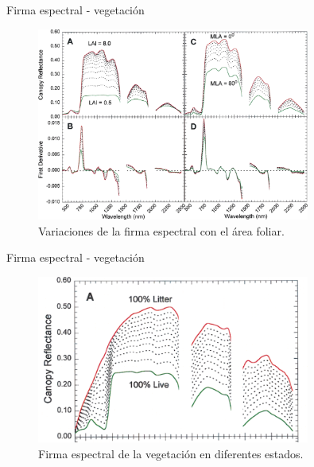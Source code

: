 \documentclass[]{beamer}
\begin{document}
\begin{frame}{Firma espectral - vegetación}
  \begin{figure}
  \centering
  \includegraphics[width=0.8\textwidth]{imagenes/leafvar.png}
  \caption{Variaciones de la firma espectral con el área foliar.}
  \end{figure}
\end{frame}

\begin{frame}{Firma espectral - vegetación}
    \begin{figure}
    \centering
    \includegraphics[width=0.8\textwidth]{imagenes/vivomuerto.png}
    \caption{Firma espectral de la vegetación en diferentes estados.}
    \end{figure}
\end{frame}
\end{document}
